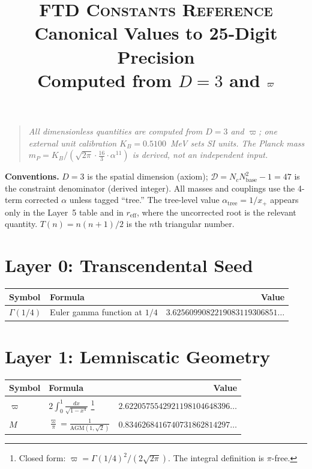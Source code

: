 \documentclass[11pt,a4paper]{article}
\title{\textsc{FTD Constants Reference}\\[6pt]
\large Canonical Values to 25-Digit Precision\\
Computed from $D = 3$ and $\vpi$}
\author{}
\date{}
\newcommand{\vpi}{\varpi}
\begin{document}
\maketitle
\thispagestyle{empty}

\begin{quote}\itshape
All dimensionless quantities are computed from $D = 3$ and $\vpi$; one external unit calibration $K_B = 0.5100$~MeV sets SI units. The Planck mass $m_P = K_B / (\sqrt{2\pi}\cdot\tfrac{16}{3}\cdot\alpha^{11})$ is derived, not an independent input.
\end{quote}

\smallskip

\noindent\textbf{Conventions.} $D = 3$ is the spatial dimension (axiom); $\mathcal{D} = N_c N_{\mathrm{base}}^2 - 1 = 47$ is the constraint denominator (derived integer). All masses and couplings use the 4-term corrected $\alpha$ unless tagged ``tree.'' The tree-level value $\alpha_{\mathrm{tree}} = 1/x_+$ appears only in the Layer~5 table and in $r_{\mathrm{eff}}$, where the uncorrected root is the relevant quantity. $T(n) = n(n+1)/2$ is the $n$th triangular number.

\bigskip

\section*{Layer 0: Transcendental Seed}

\begin{longtable}{lp{5.5cm}r}
\toprule
\textbf{Symbol} & \textbf{Formula} & \textbf{Value} \\
\midrule
\endhead
$\Gamma(1/4)$ & Euler gamma function at $1/4$ &
$3.6256099082219083119306851\ldots$ \\
\bottomrule
\end{longtable}

\section*{Layer 1: Lemniscatic Geometry}

\begin{longtable}{lp{5.5cm}r}
\toprule
\textbf{Symbol} & \textbf{Formula} & \textbf{Value} \\
\midrule
\endhead
$\vpi$ & $\displaystyle 2\!\int_0^1 \frac{dx}{\sqrt{1-x^4}}$%
\footnote{Closed form: $\vpi = \Gamma(1/4)^2/(2\sqrt{2\pi})$. The integral definition is $\pi$-free.} &
$2.6220575542921198104648396\ldots$ \\[8pt]
$M$ & $\displaystyle\frac{\vpi}{\pi} = \frac{1}{\mathrm{AGM}(1,\sqrt{2})}$ &
$0.8346268416740731862814297\ldots$ \\
\bottomrule
\end{longtable}
\end{document}
